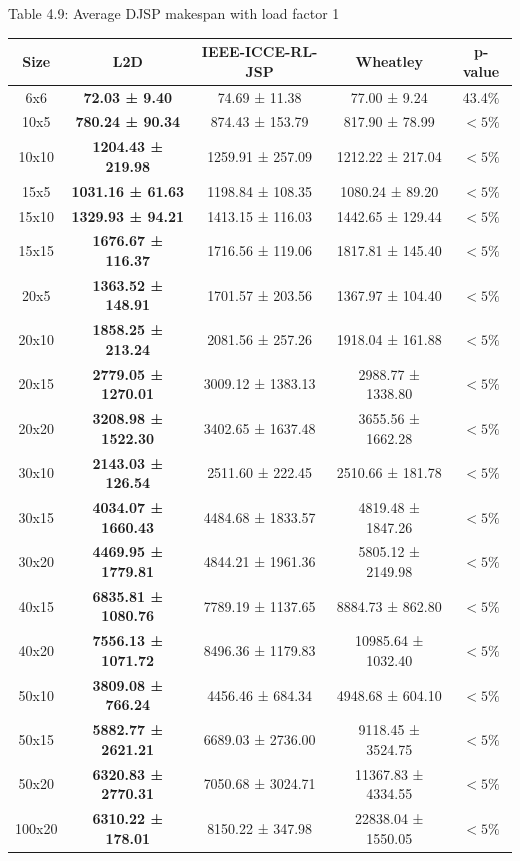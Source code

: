 \begin{table}
    Table 4.9: Average DJSP makespan with load factor 1\\
    \vspace{1mm}
    \label{table:4.6}
    \footnotesize 
    \begin{tabular}{ccccc}
        \toprule
        Size & L2D & IEEE-ICCE-RL-JSP & Wheatley & p-value \\
        \midrule
        6x6 & \textbf{72.03 ± 9.40} & 74.69 ± 11.38 & 77.00 ± 9.24 & 43.4$\%$ \\
        10x5 & \textbf{780.24 ± 90.34} & 874.43 ± 153.79 & 817.90 ± 78.99 & $< 5\%$ \\
        10x10 & \textbf{1204.43 ± 219.98} & 1259.91 ± 257.09 & 1212.22 ± 217.04 & $< 5\%$ \\
        15x5 & \textbf{1031.16 ± 61.63} & 1198.84 ± 108.35 & 1080.24 ± 89.20 & $< 5\%$ \\
        15x10 & \textbf{1329.93 ± 94.21} & 1413.15 ± 116.03 & 1442.65 ± 129.44 & $< 5\%$ \\
        15x15 & \textbf{1676.67 ± 116.37} & 1716.56 ± 119.06 & 1817.81 ± 145.40 & $< 5\%$ \\
        20x5 & \textbf{1363.52 ± 148.91} & 1701.57 ± 203.56 & 1367.97 ± 104.40 & $< 5\%$ \\
        20x10 & \textbf{1858.25 ± 213.24} & 2081.56 ± 257.26 & 1918.04 ± 161.88 & $< 5\%$ \\
        20x15 & \textbf{2779.05 ± 1270.01} & 3009.12 ± 1383.13 & 2988.77 ± 1338.80 & $< 5\%$ \\
        20x20 & \textbf{3208.98 ± 1522.30} & 3402.65 ± 1637.48 & 3655.56 ± 1662.28 & $< 5\%$ \\
        30x10 & \textbf{2143.03 ± 126.54} & 2511.60 ± 222.45 & 2510.66 ± 181.78 & $< 5\%$ \\
        30x15 & \textbf{4034.07 ± 1660.43} & 4484.68 ± 1833.57 & 4819.48 ± 1847.26 & $< 5\%$ \\
        30x20 & \textbf{4469.95 ± 1779.81} & 4844.21 ± 1961.36 & 5805.12 ± 2149.98 & $< 5\%$ \\
        40x15 & \textbf{6835.81 ± 1080.76} & 7789.19 ± 1137.65 & 8884.73 ± 862.80 & $< 5\%$ \\
        40x20 & \textbf{7556.13 ± 1071.72} & 8496.36 ± 1179.83 & 10985.64 ± 1032.40 & $< 5\%$ \\
        50x10 & \textbf{3809.08 ± 766.24} & 4456.46 ± 684.34 & 4948.68 ± 604.10 & $< 5\%$ \\
        50x15 & \textbf{5882.77 ± 2621.21} & 6689.03 ± 2736.00 & 9118.45 ± 3524.75 & $< 5\%$ \\
        50x20 & \textbf{6320.83 ± 2770.31} & 7050.68 ± 3024.71 & 11367.83 ± 4334.55 & $< 5\%$ \\
        100x20 & \textbf{6310.22 ± 178.01} & 8150.22 ± 347.98 & 22838.04 ± 1550.05 & $< 5\%$ \\
        \bottomrule
    \end{tabular}
\end{table}
    
